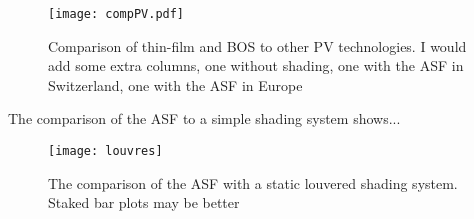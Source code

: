 \begin{figure}[H]
\begin{center}
\texttt{[image: compPV.pdf]}
\caption{Comparison of thin-film and BOS to other PV technologies. I would add some extra columns, one without shading, one with the ASF in Switzerland, one with the ASF in Europe}
\label{fig:compPV}
\end{center}
\end{figure}

The comparison of the ASF to a simple shading system shows...


\begin{figure}[H]
\begin{center}
\texttt{[image: louvres]}
\caption{The comparison of the ASF with a static louvered shading system. Staked bar plots may be better}
\label{fig:louvres}
\end{center}
\end{figure}



